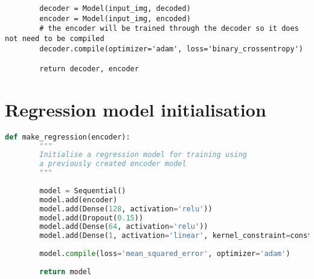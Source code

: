 \documentclass{l4proj}
\begin{document}
\begin{appendices}
\begin{lstlisting}
        decoder = Model(input_img, decoded)
        encoder = Model(input_img, encoded)
        # the encoder will be trained through the decoder so it does not need to be compiled
        decoder.compile(optimizer='adam', loss='binary_crossentropy')
    
        return decoder, encoder
\end{lstlisting}

\section{Regression model initialisation}

\begin{lstlisting}[language=python, caption={Keras code for initialising the regression model developed here. It is constructed from an encoder model which has been previously initialised. The encoder is then extended with fully connected (Dense) layers of decreasing sizes, separated by a Dropout layer for robustness. The final layer is activated by a linear function constrained not to be negative, and outputs a numeric value.}, label=lst:regression]
    def make_regression(encoder):
        """
        Initialise a regression model for training using
        a previously created encoder model
        """
    
        model = Sequential()
        model.add(encoder)
        model.add(Dense(128, activation='relu'))
        model.add(Dropout(0.15))
        model.add(Dense(64, activation='relu'))
        model.add(Dense(1, activation='linear', kernel_constraint=constraints.NonNeg()))
    
        model.compile(loss='mean_squared_error', optimizer='adam')
        
        return model
\end{lstlisting}

\end{appendices}






\end{document}

